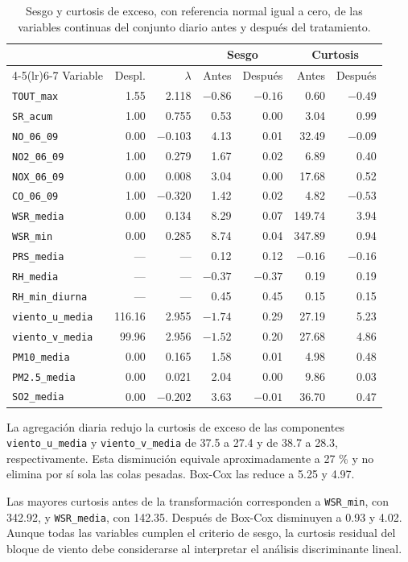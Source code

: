 \begin{table}[t]
  \centering
  \caption{Sesgo y curtosis de exceso, con referencia normal igual a cero, de
    las variables continuas del conjunto diario antes y después del
    tratamiento.}
  \label{tab:dic-diario-sesgo}
  \small
  \setlength{\tabcolsep}{6pt}
  \begin{tabular}{lrrrrrr}
    \toprule
    & & & \multicolumn{2}{c}{Sesgo} & \multicolumn{2}{c}{Curtosis} \\
    \cmidrule(lr){4-5}\cmidrule(lr){6-7}
    Variable & Despl. & $\lambda$ & Antes & Después & Antes & Después \\
    \midrule
    \texttt{TOUT\_max} & 1.55 & 2.118 & $-0.86$ & $-0.16$ & 0.60 & $-0.49$ \\
    \texttt{SR\_acum} & 1.00 & 0.755 & 0.53 & 0.00 & 3.04 & 0.99 \\
    \texttt{NO\_06\_09} & 0.00 & $-0.103$ & 4.13 & 0.01 & 32.49 & $-0.09$ \\
    \texttt{NO2\_06\_09} & 1.00 & 0.279 & 1.67 & 0.02 & 6.89 & 0.40 \\
    \texttt{NOX\_06\_09} & 0.00 & 0.008 & 3.04 & 0.00 & 17.68 & 0.52 \\
    \texttt{CO\_06\_09} & 1.00 & $-0.320$ & 1.42 & 0.02 & 4.82 & $-0.53$ \\
    \texttt{WSR\_media} & 0.00 & 0.134 & 8.29 & 0.07 & 149.74 & 3.94 \\
    \texttt{WSR\_min} & 0.00 & 0.285 & 8.74 & 0.04 & 347.89 & 0.94 \\
    \texttt{PRS\_media} & --- & --- & 0.12 & 0.12 & $-0.16$ & $-0.16$ \\
    \texttt{RH\_media} & --- & --- & $-0.37$ & $-0.37$ & 0.19 & 0.19 \\
    \texttt{RH\_min\_diurna} & --- & --- & 0.45 & 0.45 & 0.15 & 0.15 \\
    \texttt{viento\_u\_media} & 116.16 & 2.955 & $-1.74$ & 0.29 & 27.19 & 5.23 \\
    \texttt{viento\_v\_media} & 99.96 & 2.956 & $-1.52$ & 0.20 & 27.68 & 4.86 \\
    \texttt{PM10\_media} & 0.00 & 0.165 & 1.58 & 0.01 & 4.98 & 0.48 \\
    \texttt{PM2.5\_media} & 0.00 & 0.021 & 2.04 & 0.00 & 9.86 & 0.03 \\
    \texttt{SO2\_media} & 0.00 & $-0.202$ & 3.63 & $-0.01$ & 36.70 & 0.47 \\
    \bottomrule
  \end{tabular}
\end{table}

La agregación diaria redujo la curtosis de exceso de las componentes
\texttt{viento\_u\_media} y \texttt{viento\_v\_media} de 37.5 a 27.4 y de 38.7
a 28.3, respectivamente. Esta disminución equivale aproximadamente a 27 \% y
no elimina por sí sola las colas pesadas. Box-Cox las reduce a 5.25 y 4.97.

Las mayores curtosis antes de la transformación corresponden a
\texttt{WSR\_min}, con 342.92, y \texttt{WSR\_media}, con 142.35. Después de
Box-Cox disminuyen a 0.93 y 4.02. Aunque todas las variables cumplen el criterio
de sesgo, la curtosis residual del bloque de viento debe considerarse al
interpretar el análisis discriminante lineal.
